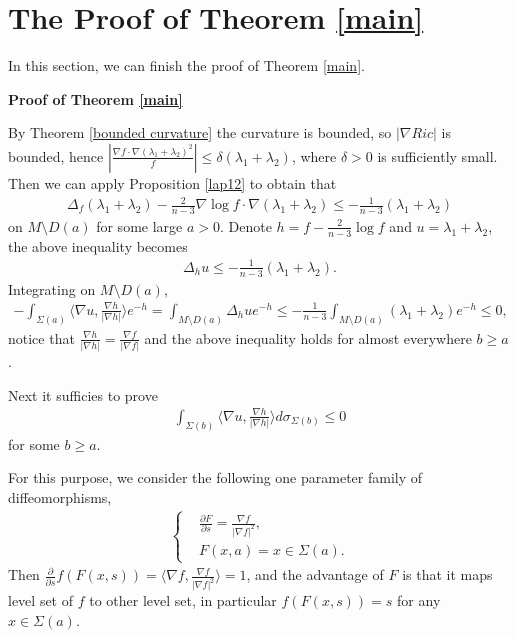 \documentclass[12pt]{amsart}
\newcommand{\ba}{\begin{eqnarray}}
\newcommand{\ea}{\end{eqnarray}}
\begin{document}
\section{The Proof of Theorem \ref{main}}\label{sec6}


In this section, we can finish the proof of Theorem \ref{main}.

\noindent\textbf{Proof of Theorem \ref{main}}

By Theorem \ref{bounded curvature} the curvature is bounded, so $|\nabla Ric|$ is bounded, hence $|\frac{\nabla f\cdot\nabla(\lambda_1+\lambda_2)^2}{f}| \leq \delta(\lambda_1+\lambda_2)$, where $\delta>0$ is sufficiently small.  Then we can apply Proposition \ref{lap12} to obtain that \begin{align*}
\Delta_f(\lambda_1+\lambda_2)-\frac{2}{n-3}\nabla \log f\cdot\nabla (\lambda_1+\lambda_2)\leq -\frac{1}{n-3}(\lambda_1+\lambda_2)
\end{align*}
on $M\setminus D(a)$ for some large $a>0$. Denote $h=f-\frac{2}{n-3}\log f$ and $u= \lambda_1+\lambda_2$, the above inequality becomes
\begin{align*}
\Delta_h u\leq -\frac{1}{n-3}(\lambda_1+\lambda_2).
\end{align*}
Integrating on $M\setminus D(a)$,
\begin{align}
-\int_{\Sigma(a)}\langle\nabla u, \frac{\nabla h}{|\nabla h|}\rangle e^{-h}=\int_{M\setminus D(a)}\Delta_h u e^{-h}\leq-\frac{1}{n-3}\int_{M\setminus D(a)}(\lambda_1+\lambda_2)e^{-h}\leq 0,\label{one direction}
\end{align}	
notice that $\frac{\nabla h}{|\nabla h|}=\frac{\nabla f}{|\nabla f|}$ and the above inequality holds for almost everywhere $b\geq a$.





	Next it sufficies to prove
	\ba\label{equivalent the other direction}
	\int_{\Sigma(b)} \langle\nabla u, \frac{\nabla h}{|\nabla h|}\rangle d\sigma_{\Sigma(b)}\leq 0
	\ea
	for some $b\geq a$.
	
	\vspace{0.5cm}
	
	For this purpose, we consider the following one parameter family of diffeomorphisms,
	\begin{equation*}
		\begin{aligned}
			\begin{cases}
				&\frac{\partial F}{\partial s}=\frac{\nabla f}{|\nabla f|^2},\\
				&F(x, a)=x \in \Sigma(a).
			\end{cases}
		\end{aligned}
	\end{equation*}
	Then $\frac{\partial }{\partial s}f(F(x, s))=\langle\nabla f, \frac{\nabla f}{|\nabla f|^2} \rangle=1$,
	and the advantage of $F$ is that it maps level set of $f$ to other level set, in particular $f(F(x, s))=s$ for any $x\in \Sigma(a)$.
	
\end{document}
